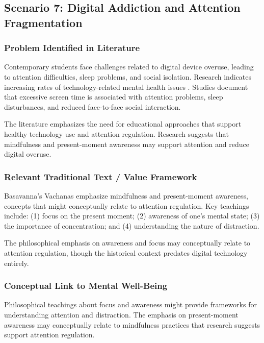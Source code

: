 \documentclass[12pt,a4paper,twocolumn]{article}
\begin{document}
\subsection{Scenario 7: Digital Addiction and Attention Fragmentation}

\subsubsection{Problem Identified in Literature}

Contemporary students face challenges related to digital device overuse, leading to attention difficulties, sleep problems, and social isolation. Research indicates increasing rates of technology-related mental health issues \citep{Nair2020}. Studies document that excessive screen time is associated with attention problems, sleep disturbances, and reduced face-to-face social interaction.

The literature emphasizes the need for educational approaches that support healthy technology use and attention regulation. Research suggests that mindfulness and present-moment awareness may support attention and reduce digital overuse.

\subsubsection{Relevant Traditional Text / Value Framework}

Basavanna's Vachanas emphasize mindfulness and present-moment awareness, concepts that might conceptually relate to attention regulation. Key teachings include: (1) focus on the present moment; (2) awareness of one's mental state; (3) the importance of concentration; and (4) understanding the nature of distraction.

The philosophical emphasis on awareness and focus may conceptually relate to attention regulation, though the historical context predates digital technology entirely.

\subsubsection{Conceptual Link to Mental Well-Being}

Philosophical teachings about focus and awareness might provide frameworks for understanding attention and distraction. The emphasis on present-moment awareness may conceptually relate to mindfulness practices that research suggests support attention regulation.
\end{document}
